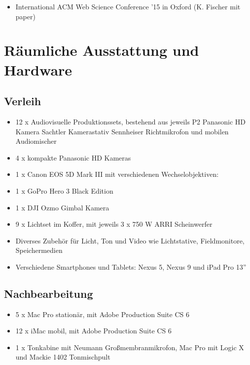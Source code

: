 \begin{itemize}
\tightlist
\item
  International ACM Web Science Conference '15 in Oxford (K. Fischer mit
  paper)
\end{itemize}

\section{Räumliche Ausstattung und
Hardware}\label{ruxe4umliche-ausstattung-und-hardware}

\subsection{Verleih}\label{verleih}

\begin{itemize}
\tightlist
\item
  12 x Audiovisuelle Produktionssets, bestehend aus jeweils P2 Panasonic
  HD Kamera Sachtler Kamerastativ Sennheiser Richtmikrofon und mobilen
  Audiomischer
\item
  4 x kompakte Panasonic HD Kameras
\item
  1 x Canon EOS 5D Mark III mit verschiedenen Wechselobjektiven:
\item
  1 x GoPro Hero 3 Black Edition
\item
  1 x DJI Ozmo Gimbal Kamera
\item
  9 x Lichtset im Koffer, mit jeweils 3 x 750 W ARRI Scheinwerfer
\item
  Diverses Zubehör für Licht, Ton und Video wie Lichtstative,
  Fieldmonitore, Speichermedien
\item
  Verschiedene Smartphones und Tablets: Nexus 5, Nexus 9 und iPad Pro
  13''
\end{itemize}

\subsection{Nachbearbeitung}\label{nachbearbeitung}

\begin{itemize}
\tightlist
\item
  5 x Mac Pro stationär, mit Adobe Production Suite CS 6
\item
  12 x iMac mobil, mit Adobe Production Suite CS 6
\item
  1 x Tonkabine mit Neumann Großmembranmikrofon, Mac Pro mit Logic X und
  Mackie 1402 Tonmischpult
\end{itemize}

